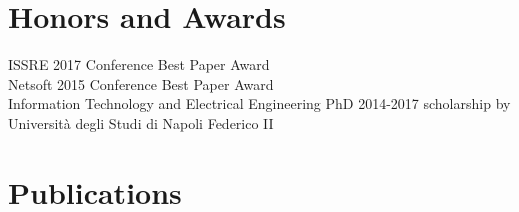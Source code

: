 \documentclass[margin,line]{resume}
\begin{document}
\begin{resume}
\section{\mysidestyle Honors and Awards}
ISSRE 2017 Conference Best Paper Award
\vspace{1mm}\\%
Netsoft 2015 Conference Best Paper Award
\vspace{1mm}\\%
Information Technology and Electrical Engineering PhD 2014-2017 scholarship by Universit\`a degli Studi di Napoli Federico II

\section{\mysidestyle Publications}


\end{resume}
\end{document}

